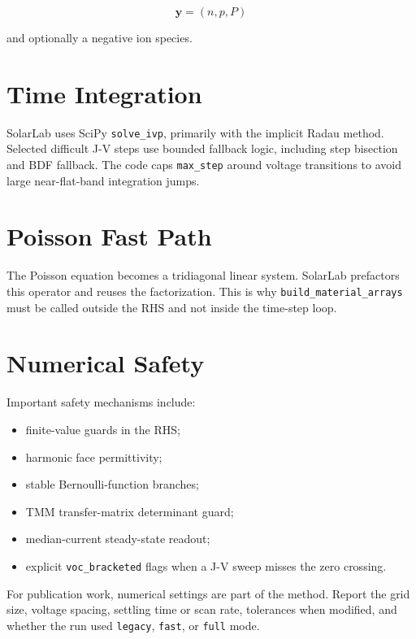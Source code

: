 \documentclass[
  11pt,
  american,
]{report}
\providecommand{\tightlist}{%
  \setlength{\itemsep}{0pt}\setlength{\parskip}{0pt}}
\begin{document}
\[
\mathbf{y}=(n,p,P)
\]

and optionally a negative ion species.

\hypertarget{time-integration}{%
\section{Time Integration}\label{time-integration}}

SolarLab uses SciPy \texttt{solve\_ivp}, primarily with the implicit
Radau method. Selected difficult J-V steps use bounded fallback logic,
including step bisection and BDF fallback. The code caps
\texttt{max\_step} around voltage transitions to avoid large
near-flat-band integration jumps.

\hypertarget{poisson-fast-path}{%
\section{Poisson Fast Path}\label{poisson-fast-path}}

The Poisson equation becomes a tridiagonal linear system. SolarLab
prefactors this operator and reuses the factorization. This is why
\texttt{build\_material\_arrays} must be called outside the RHS and not
inside the time-step loop.

\hypertarget{numerical-safety}{%
\section{Numerical Safety}\label{numerical-safety}}

Important safety mechanisms include:

\begin{itemize}
\tightlist
\item
  finite-value guards in the RHS;
\item
  harmonic face permittivity;
\item
  stable Bernoulli-function branches;
\item
  TMM transfer-matrix determinant guard;
\item
  median-current steady-state readout;
\item
  explicit \texttt{voc\_bracketed} flags when a J-V sweep misses the
  zero crossing.
\end{itemize}

For publication work, numerical settings are part of the method. Report
the grid size, voltage spacing, settling time or scan rate, tolerances
when modified, and whether the run used \texttt{legacy}, \texttt{fast},
or \texttt{full} mode.
\end{document}
